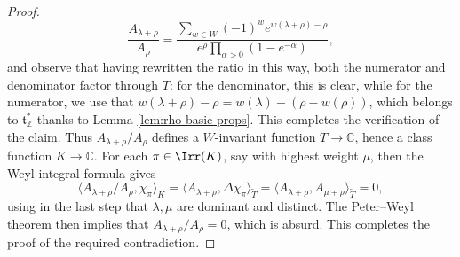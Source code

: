 \documentclass[reqno]{amsart} 
\begin{document}
\begin{proof}
  \begin{equation*}
    \frac{A_{\lambda+\rho}}{A_{\rho}} = \frac { \sum_{w \in W} (-1)^w e^{w(\lambda+\rho) - \rho } } { e^{\rho} \prod_{\alpha > 0} (1 - e^{-\alpha}) },
  \end{equation*}
  and observe that having rewritten the ratio in this way, both the numerator and denominator factor through $T$: for the denominator, this is clear, while for the numerator, we use that $w(\lambda+\rho) - \rho = w(\lambda) - (\rho - w(\rho))$, which belongs to $\mathfrak{t}_{\mathbb{Z}}^*$ thanks to Lemma \ref{lem:rho-basic-props}.  This completes the verification of the claim.  Thus $A_{\lambda+\rho}/A_\rho$ defines a $W$-invariant function $T \rightarrow \mathbb{C}$, hence a class function $K \rightarrow \mathbb{C}$.  For each $\pi \in \Irr(K)$, say with highest weight $\mu$, then the Weyl integral formula gives
  \begin{equation*}
    \langle A_{\lambda+\rho}/A_\rho, \chi_\pi \rangle_K = \langle A_{\lambda+\rho}, \Delta \chi_\pi \rangle_{\tilde{T}} = \langle A_{\lambda+\rho}, A_{\mu+\rho} \rangle_{\tilde{T}}= 0,
  \end{equation*}
  using in the last step that $\lambda, \mu$ are dominant and distinct.  The Peter--Weyl theorem then implies that $A_{\lambda+\rho}/A_\rho = 0$, which is absurd.  This completes the proof of the required contradiction.
\end{proof}
\end{document}

